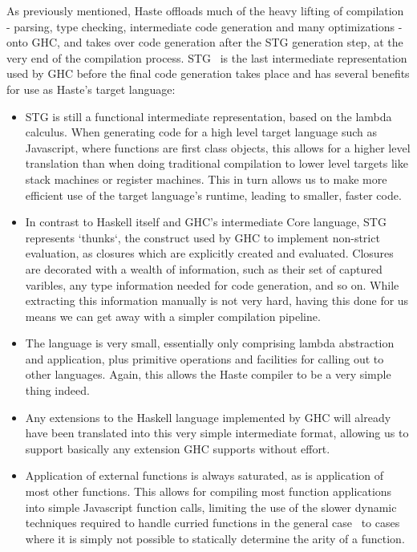 \documentclass[preprint]{sigplanconf}
\begin{document}
As previously mentioned, Haste offloads much of the heavy lifting of
compilation - parsing, type checking, intermediate code generation and many
optimizations - onto GHC, and takes over code generation after the STG
generation step, at the very end of the compilation process. STG\ \cite{stg} is
the last intermediate representation used by GHC before the final code
generation takes place and has several benefits for use as Haste's target
language:

\begin{itemize}
  \item STG is still a functional intermediate representation, based on the
        lambda calculus. When generating code for a high level target language
        such as Javascript, where functions are first class objects, this
        allows for a higher level translation than when doing traditional
        compilation to lower level targets like stack machines or register
        machines. This in turn allows us to make more efficient use of the
        target language's runtime, leading to smaller, faster code.
  \item In contrast to Haskell itself and GHC's intermediate Core language, STG
        represents `thunks`, the construct used by GHC to implement non-strict
        evaluation, as closures which are explicitly created and evaluated.
        Closures are decorated with a wealth of information, such as their set
        of captured varibles, any type information needed for code generation,
        and so on. While extracting this information manually is not very hard,
        having this done for us means we can get away with a simpler
        compilation pipeline.
  \item The language is very small, essentially only comprising lambda
        abstraction and application, plus primitive operations and facilities
        for calling out to other languages. Again, this allows the Haste
        compiler to be a very simple thing indeed.
  \item Any extensions to the Haskell language implemented by GHC will already
        have been translated into this very simple intermediate format,
        allowing us to support basically any extension GHC supports without
        effort.
  \item Application of external functions is always saturated, as is
        application of most other functions. This allows for compiling most
        function applications into simple Javascript function calls, limiting
        the use of the slower dynamic techniques required to handle curried
        functions in the general case\ \cite{fastcurry} to cases where it is
        simply not possible to statically determine the arity of a function.
\end{itemize}
\end{document}
